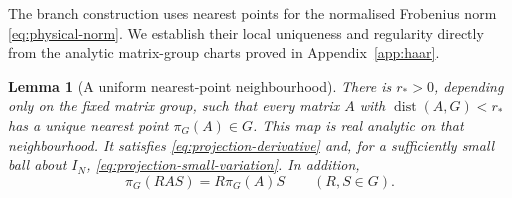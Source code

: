 \documentclass[11pt,reqno]{amsart}
\numberwithin{equation}{section}
\newtheorem{lemma}[theorem]{Lemma}
\theoremstyle{definition}
\theoremstyle{remark}
\begin{document}
The branch construction uses nearest points for the normalised
Frobenius norm \eqref{eq:physical-norm}. We establish their local
uniqueness and regularity directly from the analytic matrix-group
charts proved in Appendix~\ref{app:haar}.

\begin{lemma}[A uniform nearest-point neighbourhood]
\label{lem:nearest-group-point}
There is \(r_*>0\), depending only on the fixed matrix group,
such that every matrix \(A\) with
\(\operatorname{dist}(A,G)<r_*\) has a unique nearest point
\(\pi_G(A)\in G\). This map is real analytic on that neighbourhood.
It satisfies \eqref{eq:projection-derivative} and, for a sufficiently
small ball about \(I_N\),
\eqref{eq:projection-small-variation}. In addition,
\begin{equation}
                      \pi_G(RAS)=R\pi_G(A)S\qquad(R,S\in G).
 \label{eq:projection-equivariance}
\end{equation}
\end{lemma}
\end{document}
